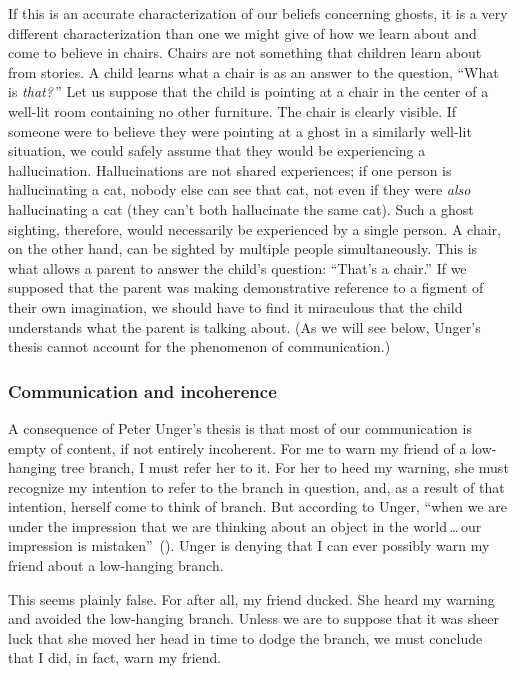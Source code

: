 \documentclass[11pt]{article}
\begin{document}
\begin{spacing}{1.5}
If this is an accurate characterization of our beliefs concerning ghosts, it is a very different characterization than one we might give of how we learn about and come to believe in chairs. Chairs are not something that children learn about from stories. A child learns what a chair is as an answer to the question, ``What is {\em that?}\,'' Let us suppose that the child is pointing at a chair in the center of a well-lit room containing no other furniture. The chair is clearly visible. If someone were to believe they were pointing at a ghost in a similarly well-lit situation, we could safely assume that they would be experiencing a hallucination. Hallucinations are not shared experiences; if one person is hallucinating a cat, nobody else can see that cat, not even if they were {\em also} hallucinating a cat (they can't both hallucinate the same cat). Such a ghost sighting, therefore, would necessarily be experienced by a single person. A chair, on the other hand, can be sighted by multiple people simultaneously. This is what allows a parent to answer the child's question: ``That's a chair.'' If we supposed that the parent was making demonstrative reference to a figment of their own imagination, we should have to find it miraculous that the child understands what the parent is talking about. (As we will see below, Unger's thesis cannot account for the phenomenon of communication.)
%

\subsubsection{Communication and incoherence}
\label{unger-comm}
A consequence of Peter Unger's thesis is that most of our communication is empty of content, if not entirely incoherent. For me to warn my friend of a low-hanging tree branch, I must refer her to it. For her to heed my warning, she must recognize my intention to refer to the branch in question, and, as a result of that intention, herself come to think of branch. But according to Unger, ``when we are under the impression that we are thinking about an object in the world\,\ldots\,our impression is mistaken''~(\citeyear[149]{unger1979}). Unger is denying that I can ever possibly warn my friend about a low-hanging branch.

This seems plainly false. For after all, my friend ducked. She heard my warning and avoided the low-hanging branch. Unless we are to suppose that it was sheer luck that she moved her head in time to dodge the branch, we must conclude that I did, in fact, warn my friend.


\end{spacing}
\end{document}
